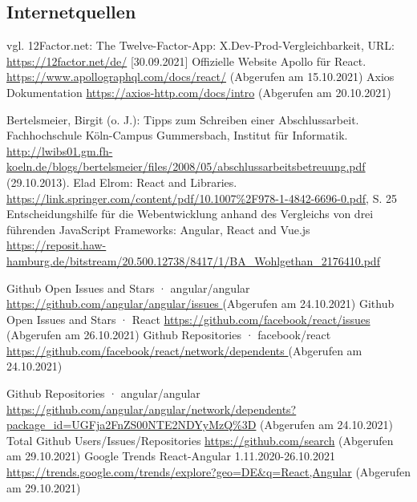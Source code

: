 \subsection{Internetquellen}
\begin{thebibliography}{HR08} %

 vgl. 12Factor.net: The Twelve-Factor-App: X.Dev-Prod-Vergleichbarkeit, URL: \url{https://12factor.net/de/} [30.09.2021]
Offizielle Website Apollo für React. \url{https://www.apollographql.com/docs/react/} (Abgerufen am 15.10.2021)
Axios Dokumentation \url{https://axios-http.com/docs/intro} (Abgerufen am 20.10.2021)

Bertelsmeier, Birgit (o. J.): Tipps zum Schrei\-b\-en ei\-n\-er Ab\-sch\-luss\-ar\-beit. Fach\-hoch\-schu\-le Köln-Campus Gummersbach, Institut für Informatik. \url{http://lwibs01.gm.fh-koeln.de/blogs/bertelsmeier/files/2008/05/abschlussarbeitsbetreuung.pdf} (29.10.2013).
Elad Elrom: React and Libraries. \url{https://link.springer.com/content/pdf/10.1007%2F978-1-4842-6696-0.pdf}, S. 25
Entscheidungshilfe für die Webentwicklung anhand des Vergleichs von drei führenden JavaScript Frameworks: Angular, React and Vue.js \url{https://reposit.haw-hamburg.de/bitstream/20.500.12738/8417/1/BA_Wohlgethan_2176410.pdf}


Github Open Issues and Stars · angular/angular \url{ https://github.com/angular/angular/issues }  (Abgerufen am 24.10.2021)
 Github Open Issues and Stars · React \url{https://github.com/facebook/react/issues} (Abgerufen am 26.10.2021)
 Github Repositories · facebook/react \url{ https://github.com/facebook/react/network/dependents } (Abgerufen am 24.10.2021)

 Github Repositories · angular/angular \url{https://github.com/angular/angular/network/dependents?package_id=UGFja2FnZS00NTE2NDYyMzQ%3D}  (Abgerufen am 24.10.2021)
 Total Github Users/Issues/Repositories \url{ https://github.com/search}  (Abgerufen am 29.10.2021)
Google Trends React-Angular 1.11.2020-26.10.2021 \url{https://trends.google.com/trends/explore?geo=DE&q=React,Angular} (Abgerufen am 29.10.2021)


\end{thebibliography}
